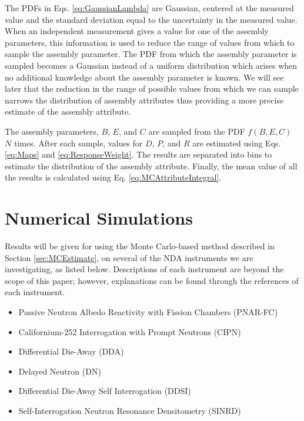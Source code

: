 \documentclass{ansnse}
\begin{document}
The PDFs in Eqs. \eqref{eq:GaussianLambda} are Gaussian, centered at the measured value and the standard deviation equal to the uncertainty in the measured value.  When an independent measurement gives a value for one of the assembly parameters, this information is used to reduce the range of values from which to sample the assembly parameter.  The PDF from which the assembly parameter is sampled becomes a Gaussian instead of a uniform distribution which arises when no additional knowledge about the assembly parameter is known.  We will see later that the reduction in the range of possible values from which we can sample narrows the distribution of assembly attributes thus providing a more precise estimate of the assembly attribute.

The assembly parameters, $B$, $E$, and $C$ are sampled from the PDF $f(B,E,C)$ $N$ times.  After each sample, values for $D$, $P$, and $R$ are estimated using Eqs. \eqref{eq:Maps} and \eqref{eq:ResponseWeight}.  The results are separated into bins to estimate the distribution of the assembly attribute.  Finally, the mean value of all the results is calculated using Eq. \eqref{eq:MCAttributeIntegral}.

\section{Numerical Simulations}\label{sec:Simulations}
Results will be given for using the Monte Carlo-based method described in Section \ref{sec:MCEstimate}, on several of the NDA instruments we are investigating, as listed below.  Descriptions of each instrument are beyond the scope of this paper; however, explanations can be found through the references of each instrument.
\begin{itemize}
    \item Passive Neutron Albedo Reactivity with Fission Chambers (PNAR-FC)\cite{Conlin:2010Deter-1}
    \item Californium-252 Interrogation with Prompt Neutrons (CIPN)\cite{Hu:2010Deter-0}
    \item Differential Die-Away (DDA)\cite{Lee:2010Monte-1}
    \item Delayed Neutron (DN)\cite{Sandoval:2010The-V-0}
    \item Differential Die-Away Self Interrogation (DDSI)\cite{Schear:2010Fissi-0}
    \item Self-Interrogation Neutron Resonance Densitometry (SINRD)\cite{LaFleur:2010Devel-0}
\end{itemize}
\end{document}
